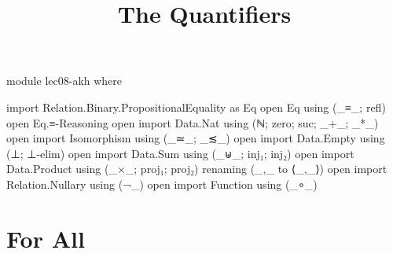 \documentclass{lecturenotes}
\title{The Quantifiers}
\begin{document}
\maketitle

\begin{code}
module lec08-akh where

import Relation.Binary.PropositionalEquality as Eq
open Eq using (_≡_; refl)
open Eq.≡-Reasoning
open import Data.Nat using (ℕ; zero; suc; _+_; _*_)
open import Isomorphism using (_≃_; _≲_)
open import Data.Empty using (⊥; ⊥-elim)
open import Data.Sum using (_⊎_; inj₁; inj₂)
open import Data.Product using (_×_; proj₁; proj₂) renaming (_,_ to ⟨_,_⟩)
open import Relation.Nullary using (¬_)
open import Function using (_∘_)
\end{code}


\section{For All}
\label{sec:forall}
\end{document}

